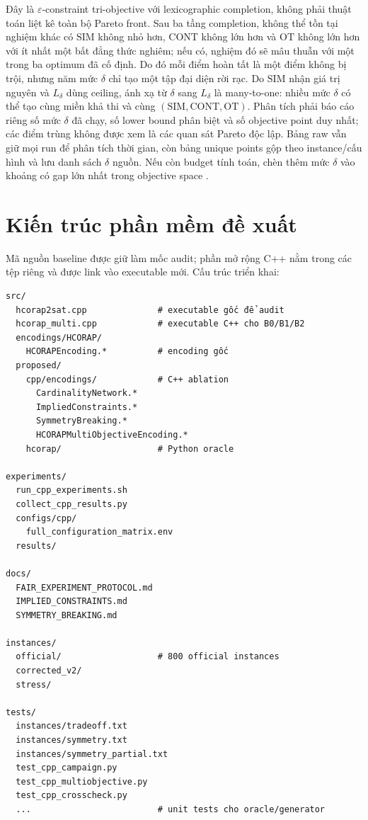 \documentclass[12pt,a4paper]{article}
\newcommand{\SIM}{\mathrm{SIM}}
\newcommand{\CONT}{\mathrm{CONT}}
\newcommand{\OT}{\mathrm{OT}}
\begin{document}
Đây là $\varepsilon$-constraint tri-objective với lexicographic completion,
không phải thuật toán liệt kê toàn bộ Pareto front. Sau ba tầng completion,
không thể tồn tại nghiệm khác có $\SIM$ không nhỏ hơn, $\CONT$ không lớn hơn và
$\OT$ không lớn hơn với ít nhất một bất đẳng thức nghiêm; nếu có, nghiệm đó sẽ
mâu thuẫn với một trong ba optimum đã cố định. Do đó mỗi điểm hoàn tất là một
điểm không bị trội, nhưng năm mức $\delta$ chỉ tạo một tập đại diện rời rạc.
Do $\SIM$ nhận giá trị nguyên và $L_\delta$ dùng ceiling, ánh xạ từ $\delta$
sang $L_\delta$ là many-to-one: nhiều mức $\delta$ có thể tạo cùng miền khả
thi và cùng $(\SIM,\CONT,\OT)$. Phân tích phải báo cáo riêng số mức $\delta$ đã
chạy, số lower bound phân biệt và số objective point duy nhất; các điểm trùng
không được xem là các quan sát Pareto độc lập. Bảng raw vẫn giữ mọi run để phân
tích thời gian, còn bảng unique points gộp theo instance/cấu hình và lưu danh
sách $\delta$ nguồn. Nếu còn budget tính toán, chèn thêm mức $\delta$ vào khoảng
có gap lớn nhất trong objective space \cite{mesquita2023}.

\section{Kiến trúc phần mềm đề xuất}

Mã nguồn baseline được giữ làm mốc audit; phần mở rộng C++ nằm trong các tệp
riêng và được link vào executable mới. Cấu trúc triển khai:

\begin{verbatim}
src/
  hcorap2sat.cpp              # executable gốc để audit
  hcorap_multi.cpp            # executable C++ cho B0/B1/B2
  encodings/HCORAP/
    HCORAPEncoding.*          # encoding gốc
  proposed/
    cpp/encodings/            # C++ ablation
      CardinalityNetwork.*
      ImpliedConstraints.*
      SymmetryBreaking.*
      HCORAPMultiObjectiveEncoding.*
    hcorap/                   # Python oracle

experiments/
  run_cpp_experiments.sh
  collect_cpp_results.py
  configs/cpp/
    full_configuration_matrix.env
  results/

docs/
  FAIR_EXPERIMENT_PROTOCOL.md
  IMPLIED_CONSTRAINTS.md
  SYMMETRY_BREAKING.md

instances/
  official/                   # 800 official instances
  corrected_v2/
  stress/

tests/
  instances/tradeoff.txt
  instances/symmetry.txt
  instances/symmetry_partial.txt
  test_cpp_campaign.py
  test_cpp_multiobjective.py
  test_cpp_crosscheck.py
  ...                         # unit tests cho oracle/generator
\end{verbatim}
\end{document}
